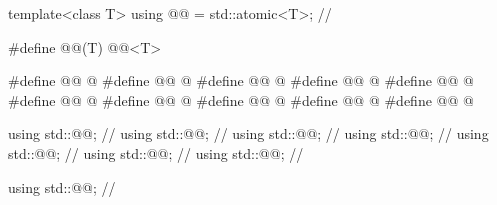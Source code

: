 \begin{codeblock}
template<class T>
  using @@ = std::atomic<T>;        // \expos

#define @@(T) @@<T>

#define @@ @\seebelow@
#define @@ @\seebelow@
#define @@ @\seebelow@
#define @@ @\seebelow@
#define @@ @\seebelow@
#define @@ @\seebelow@
#define @@ @\seebelow@
#define @@ @\seebelow@
#define @@ @\seebelow@
#define @@ @\seebelow@

using std::@@;             // \seebelow
using std::@@;     // \seebelow
using std::@@;     // \seebelow
using std::@@;     // \seebelow
using std::@@;     // \seebelow
using std::@@;     // \seebelow
using std::@@;     // \seebelow

using std::@@;              // \seebelow


\end{codeblock}
